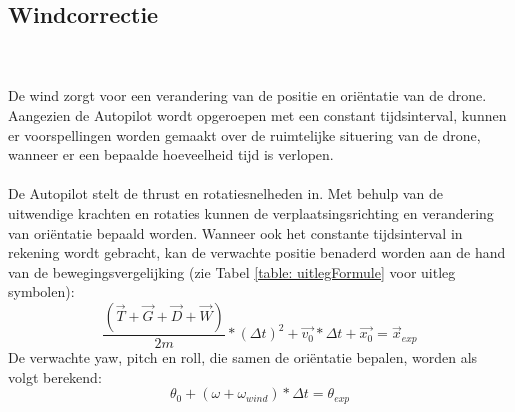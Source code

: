 \subsection{Windcorrectie}
\\
\\
De wind zorgt voor een verandering van de positie en ori\"entatie van de drone. Aangezien de Autopilot wordt opgeroepen met een constant tijdsinterval, kunnen er voorspellingen worden gemaakt over de ruimtelijke situering van de drone, wanneer er een bepaalde hoeveelheid tijd is verlopen.
\\
\\
De Autopilot stelt de thrust en rotatiesnelheden in. Met behulp van de uitwendige krachten en rotaties kunnen de verplaatsingsrichting en verandering van ori\"entatie bepaald worden. Wanneer ook het constante tijdsinterval in rekening wordt gebracht, kan de verwachte positie benaderd worden aan de hand van de bewegingsvergelijking (zie Tabel \ref{table: uitlegFormule} voor uitleg symbolen):
\begin{equation}
	 \frac{(\vec{T} + \vec{G} + \vec{D} + \vec{W}) }{2m} * (\Delta t)^2 + \vec{v_0} * \Delta t + \vec{x_0} = \vec{x}_{exp}
\end{equation}
De verwachte yaw, pitch en roll, die samen de ori\"entatie bepalen, worden als volgt berekend:
\begin{equation}
	\theta_0 + (\omega + \omega_{wind})*\Delta t = \theta_{exp}
\end{equation}

